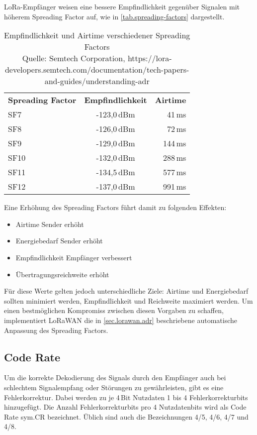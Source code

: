 LoRa-Empfänger weisen eine bessere Empfindlichkeit gegenüber Signalen mit höherem Spreading Factor auf, wie in \autoref{tab.spreading-factors} dargestellt.
\begin{table}[htbp]
\centering
\begin{tabular}{@{}lcr@{}}
\textbf{Spreading Factor} & \textbf{Empfindlichkeit} & \textbf{Airtime} \\
SF7  & -123,0\,dBm &  41\,ms \\
SF8  & -126,0\,dBm &  72\,ms \\
SF9  & -129,0\,dBm & 144\,ms \\
SF10 & -132,0\,dBm & 288\,ms \\
SF11 & -134,5\,dBm & 577\,ms \\
SF12 & -137,0\,dBm & 991\,ms \\
\end{tabular}
\caption[Empfindlichkeit und Airtime verschiedener Spreading Factors]{Empfindlichkeit und Airtime verschiedener Spreading Factors\\Quelle: Semtech Corporation, https://lora-developers.semtech.com/documentation/tech-papers-and-guides/understanding-adr}
\label{tab.spreading-factors}
\end{table}
Eine Erhöhung des Spreading Factors führt damit zu folgenden Effekten:
\begin{itemize}\singlespacing\setlength\itemsep{-0.2em}
\item Airtime Sender erhöht
\item Energiebedarf Sender erhöht
\item Empfindlichkeit Empfänger verbessert
\item Übertragungsreichweite erhöht
\end{itemize}
Für diese Werte gelten jedoch unterschiedliche Ziele: Airtime und Energiebedarf sollten minimiert werden, Empfindlichkeit und Reichweite maximiert werden.\cite{loralimits}
Um einen bestmöglichen Kompromiss zwischen diesen Vorgaben zu schaffen, implementiert LoRaWAN die in \autoref{sec.lorawan.adr} beschriebene automatische Anpassung des Spreading Factors.


\subsection{Code Rate}
Um die korrekte Dekodierung des Signals durch den Empfänger auch bei schlechtem Signalempfang oder Störungen zu gewährleisten, gibt es eine Fehlerkorrektur.
Dabei werden zu je 4\,Bit Nutzdaten 1 bis 4 Fehlerkorrekturbits hinzugefügt.
Die Anzahl Fehlerkorrekturbits pro 4 Nutzdatenbits wird als Code Rate \gls{sym.CR} bezeichnet.
Üblich sind auch die Bezeichnungen 4/5, 4/6, 4/7 und 4/8.

